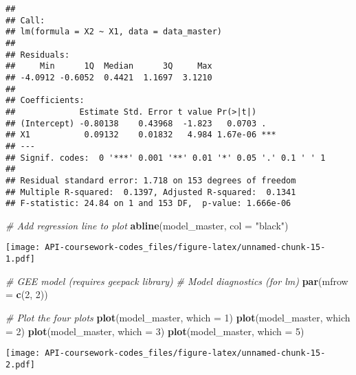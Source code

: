 \documentclass[
]{article}
\newenvironment{Shaded}{\begin{snugshade}}{\end{snugshade}}
\newcommand{\AttributeTok}[1]{\textcolor[rgb]{0.13,0.29,0.53}{#1}}
\newcommand{\CommentTok}[1]{\textcolor[rgb]{0.56,0.35,0.01}{\textit{#1}}}
\newcommand{\DecValTok}[1]{\textcolor[rgb]{0.00,0.00,0.81}{#1}}
\newcommand{\FunctionTok}[1]{\textcolor[rgb]{0.13,0.29,0.53}{\textbf{#1}}}
\newcommand{\NormalTok}[1]{#1}
\newcommand{\OtherTok}[1]{\textcolor[rgb]{0.56,0.35,0.01}{#1}}
\newcommand{\SpecialCharTok}[1]{\textcolor[rgb]{0.81,0.36,0.00}{\textbf{#1}}}
\newcommand{\StringTok}[1]{\textcolor[rgb]{0.31,0.60,0.02}{#1}}
\begin{document}
\begin{verbatim}
## 
## Call:
## lm(formula = X2 ~ X1, data = data_master)
## 
## Residuals:
##     Min      1Q  Median      3Q     Max 
## -4.0912 -0.6052  0.4421  1.1697  3.1210 
## 
## Coefficients:
##             Estimate Std. Error t value Pr(>|t|)    
## (Intercept) -0.80138    0.43968  -1.823   0.0703 .  
## X1           0.09132    0.01832   4.984 1.67e-06 ***
## ---
## Signif. codes:  0 '***' 0.001 '**' 0.01 '*' 0.05 '.' 0.1 ' ' 1
## 
## Residual standard error: 1.718 on 153 degrees of freedom
## Multiple R-squared:  0.1397, Adjusted R-squared:  0.1341 
## F-statistic: 24.84 on 1 and 153 DF,  p-value: 1.666e-06
\end{verbatim}

\begin{Shaded}
\begin{Highlighting}[]
\CommentTok{\# Add regression line to plot}
\FunctionTok{abline}\NormalTok{(model\_master, }\AttributeTok{col =} \StringTok{"black"}\NormalTok{)}
\end{Highlighting}
\end{Shaded}

\texttt{[image: API-coursework-codes\_files/figure-latex/unnamed-chunk-15-1.pdf]}

\begin{Shaded}
\begin{Highlighting}[]
\CommentTok{\# GEE model (requires geepack library)}
\CommentTok{\# Model diagnostics (for lm)}
\FunctionTok{par}\NormalTok{(}\AttributeTok{mfrow =} \FunctionTok{c}\NormalTok{(}\DecValTok{2}\NormalTok{, }\DecValTok{2}\NormalTok{))}

\CommentTok{\# Plot the four plots}
\FunctionTok{plot}\NormalTok{(model\_master, }\AttributeTok{which =} \DecValTok{1}\NormalTok{)  }
\FunctionTok{plot}\NormalTok{(model\_master, }\AttributeTok{which =} \DecValTok{2}\NormalTok{)  }
\FunctionTok{plot}\NormalTok{(model\_master, }\AttributeTok{which =} \DecValTok{3}\NormalTok{)  }
\FunctionTok{plot}\NormalTok{(model\_master, }\AttributeTok{which =} \DecValTok{5}\NormalTok{) }
\end{Highlighting}
\end{Shaded}

\texttt{[image: API-coursework-codes\_files/figure-latex/unnamed-chunk-15-2.pdf]}

\begin{Shaded}
\end{Shaded}
\end{document}
